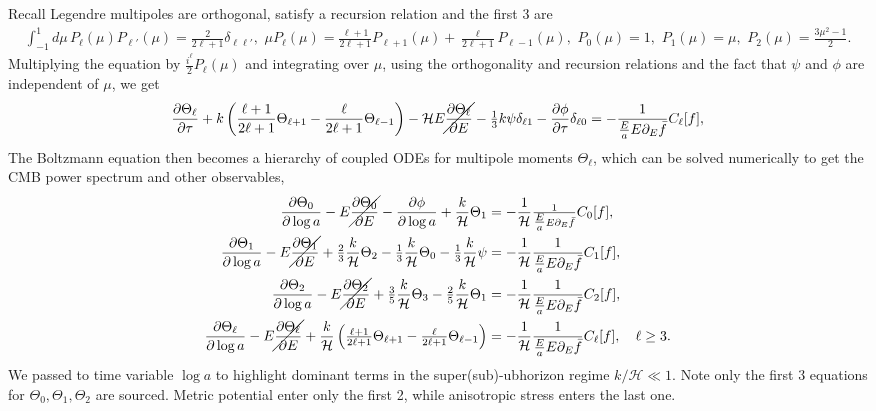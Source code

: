 Recall Legendre multipoles are orthogonal, satisfy a recursion relation and the first 3 are
{\small
\begin{align}
    \int_{-1}^1 \!\!d\mu\, P_\ell(\mu) P_{\ell'}(\mu) = \tfrac{2}{2\ell+1} \delta_{\ell \ell'},\,\,
    \mu P_\ell(\mu) = \tfrac{\ell+1}{2\ell + 1} P_{\ell+1}(\mu) + \tfrac{\ell}{2\ell + 1} P_{\ell-1}(\mu),\,\,
    P_0(\mu) = 1, \,\, P_1(\mu) = \mu, \,\, P_2(\mu) = \frac{3\mu^2 - 1}{2}.
\end{align}}
Multiplying the equation by $\frac{i^\ell}{2}P_\ell(\mu)$ and integrating over $\mu$, using the orthogonality and recursion relations and the fact that $\psi$ and $\phi$ are independent of $\mu$, we get
{\small
\begin{align}
    \frac{\partial \Theta_\ell}{\partial \tau} + k\left(\frac{\ell+1}{2\ell + 1} \Theta_{\ell+1} - \frac{\ell}{2\ell + 1} \Theta_{\ell-1}\right) - \mathcal{H}E\cancel{\frac{\partial \Theta_\ell}{\partial E}} -\tfrac13 k\psi \delta_{\ell 1} - \frac{\partial \phi}{\partial\tau} \delta_{\ell 0} = - \frac{1}{\tfrac{E}{a}E\partial_E\bar{f}} C_\ell[f],
\end{align}}
The Boltzmann equation then becomes a hierarchy of coupled ODEs for multipole moments $\Theta_\ell$, which can be solved numerically to get the CMB power spectrum and other observables,
{\small\begin{align}
\begin{aligned}
    \frac{\partial \Theta_0}{\partial \log a} - E\cancel{\frac{\partial \Theta_0}{\partial E}}- \frac{\partial \phi}{\partial\log a}+ \frac{k}{\mathcal{H}} \Theta_1 &= - \frac{1}{\mathcal{H}}\tfrac{1}{\tfrac{E}{a}E\partial_E\bar{f}} C_0[f],\\
    \frac{\partial \Theta_1}{\partial \log a} -E\cancel{\frac{\partial \Theta_1}{\partial E}}+ \tfrac{2}{3} \frac{k}{\mathcal{H}} \Theta_2 -\tfrac13 \frac{k}{\mathcal{H}}\Theta_0- \tfrac{1}{3} \frac{k}{\mathcal{H}} \psi &= - \frac{1}{\mathcal{H}}\frac{1}{\tfrac{E}{a}E\partial_E\bar{f}} C_1[f],\\
    \frac{\partial \Theta_2}{\partial \log a} -E\cancel{\frac{\partial \Theta_2}{\partial E}}+ \tfrac{3}{5} \frac{k}{\mathcal{H}} \Theta_3 - \tfrac{2}{5} \frac{k}{\mathcal{H}} \Theta_1 &= - \frac{1}{\mathcal{H}}\frac{1}{\tfrac{E}{a}E\partial_E\bar{f}} C_2[f],\\
    \frac{\partial \Theta_\ell}{\partial \log a} -E\cancel{\frac{\partial \Theta_\ell}{\partial E}}+ \frac{k}{\mathcal{H}}\left(\tfrac{\ell+1}{2\ell + 1} \Theta_{\ell+1} - \tfrac{\ell}{2\ell + 1} \Theta_{\ell-1}\right) &= -\frac{1}{\mathcal{H}} \frac{1}{\tfrac{E}{a}E\partial_E\bar{f}} C_\ell[f], \quad \ell\geq 3.
\end{aligned}
\end{align}}
We passed to time variable $\log a$ to highlight dominant terms in the super(sub)-ubhorizon regime $k/\mathcal{H}\ll1$.
Note only the first 3 equations for $\Theta_0, \Theta_1, \Theta_2$ are sourced.
Metric potential enter only the first 2, while anisotropic stress enters the last one. 

